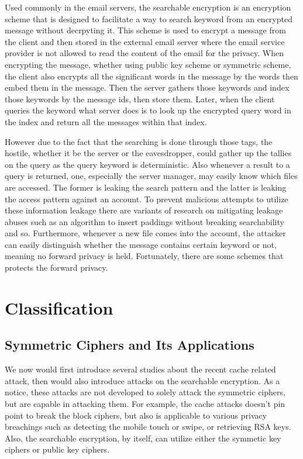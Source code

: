 \documentclass[a4paper]{article}
\begin{document}
Used commonly in the email servers, the searchable encryption \cite{curtmola2011searchable} is an encryption scheme that is designed to facilitate a way to search keyword from an encrypted message without decrpyting it. This scheme is used to encrypt a message from the client and then stored in the external email server where the email service provider is not allowed to read the content of the email for the privacy. When encrypting the message, whether using public key scheme or symmetric scheme, the client also encrypts all the significant words in the message by the words then embed them in the message. Then the server gathers those keywords and index those keywords by the message ids, then store them. Later, when the client queries the keyword what server does is to look up the encrypted query word in the index and return all the messages within that index.
\par However due to the fact that the searching is done through those tags, the hostile, whether it be the server or the eavesdropper, could gather up the tallies on the query as the query keyword is deterministic. Also whenever a result to a query is returned, one, especially the server manager, may easily know which files are accessed. The former is leaking the search pattern and the latter is leaking the access pattern against an account. To prevent malicious attempts to utilize these information leakage there are variants of research on mitigating leakage abuses such as an algorithm to insert paddings without breaking searchability and so. Furthermore, whenever a new file comes into the account, the attacker can easily distinguish whether the message contains certain keyword or not, meaning no forward privacy is held. Fortunately, there are some schemes that protects the forward privacy.

\section{Classification}

\subsection{Symmetric Ciphers and Its Applications}

We now would first introduce several studies about the recent cache related attack, then would also introduce attacks on the searchable encryption. As a notice, these attacks are not developed to solely attack the symmetric ciphers, but are capable in attacking them. For example, the cache attacks doesn't pin point to break the block ciphers, but also is applicable to various privacy breachings such as detecting the mobile touch or swipe, or retrieving RSA keys. Also, the searchable encryption, by itself, can utilize either the symmetic key ciphers or public key ciphers.
\end{document}
